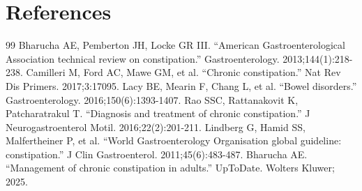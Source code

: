 \section*{References}
\begin{thebibliography}{99}
 Bharucha AE, Pemberton JH, Locke GR III. ``American Gastroenterological Association technical review on constipation.'' Gastroenterology. 2013;144(1):218-238.
 Camilleri M, Ford AC, Mawe GM, et al. ``Chronic constipation.'' Nat Rev Dis Primers. 2017;3:17095.
 Lacy BE, Mearin F, Chang L, et al. ``Bowel disorders.'' Gastroenterology. 2016;150(6):1393-1407.
 Rao SSC, Rattanakovit K, Patcharatrakul T. ``Diagnosis and treatment of chronic constipation.'' J Neurogastroenterol Motil. 2016;22(2):201-211.
 Lindberg G, Hamid SS, Malfertheiner P, et al. ``World Gastroenterology Organisation global guideline: constipation.'' J Clin Gastroenterol. 2011;45(6):483-487.
 Bharucha AE. ``Management of chronic constipation in adults.'' UpToDate. Wolters Kluwer; 2025.
\end{thebibliography}
